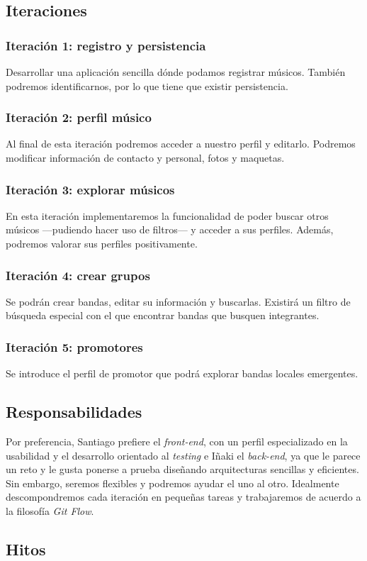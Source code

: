 \documentclass[a4paper,12pt]{article}
\begin{document}
\subsection{Iteraciones}
\subsubsection{Iteración 1: registro y persistencia}
Desarrollar una aplicación sencilla dónde podamos registrar músicos. También podremos identificarnos, por lo que tiene que existir persistencia.
\subsubsection{Iteración 2: perfil músico}
Al final de esta iteración podremos acceder a nuestro perfil y editarlo. Podremos modificar información de contacto y personal, fotos y maquetas.
\subsubsection{Iteración 3: explorar músicos}
En esta iteración implementaremos la funcionalidad de poder buscar otros músicos ---pudiendo hacer uso de filtros--- y acceder a sus perfiles. Además, podremos valorar sus perfiles positivamente.
\subsubsection{Iteración 4: crear grupos}
Se podrán crear bandas, editar su información y buscarlas. Existirá un filtro de búsqueda especial con el que encontrar bandas que busquen integrantes.
\subsubsection{Iteración 5: promotores}
Se introduce el perfil de promotor que podrá explorar bandas locales emergentes.
\subsection{Responsabilidades}
Por preferencia, Santiago prefiere el \textit{front-end}, con un perfil especializado en la usabilidad y el desarrollo orientado al \textit{testing} e Iñaki el \textit{back-end}, ya que le parece un reto y le gusta ponerse a prueba diseñando arquitecturas sencillas y eficientes. Sin embargo, seremos flexibles y podremos ayudar el uno al otro. Idealmente descompondremos cada iteración en pequeñas tareas y trabajaremos de acuerdo a la filosofía \textit{Git Flow}.
\subsection{Hitos}
\end{document}

